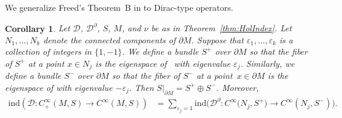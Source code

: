 \documentclass[11pt]{article}
\numberwithin{equation}{section}
\numberwithin{equation}{section}
\newtheorem{Corollary}[Theorem]{Corollary}
\begin{document}
We generalize Freed's Theorem~B in \cite{Freed} to Dirac-type operators.

\begin{Corollary}\label{cor:Freed}
Let $\mathcal{D}$, $\mathcal{D}^\partial$, $S$, $M$, and $\nu$ be as in Theorem~{\rm\ref{thm:HolIndex}}.
Let $N_1,\hdots,N_k$ denote the connected components of $\partial M$.
Suppose that $\varepsilon_1,\hdots,\varepsilon_k$ is a collection of integers in $\{1,-1\}$. We define a bundle $S^+$ over $\partial M$ so that the fiber of $S^+$ at a point $x \in N_j$ is the eigenspace of~ with eigenvalue $\varepsilon_j$. Similarly, we define a bundle $S^-$ over $\partial M$ so that the fiber of $S^-$ at a point~${x \in \partial M}$ is the eigenspace of  with eigenvalue $-\varepsilon_j$. Then $S|_{\partial M} = S^+ \oplus S^-$. Moreover,
\begin{align*}
\mathrm{ind}(\mathcal{D}\colon C^\infty_+(M,S)\to C^\infty(M,S))
&=
\sum_{\varepsilon_j=1} \mathrm{ind}\big(\mathcal{D}^\partial\colon C^\infty\big(N_j,S^+\big)\to C^\infty(N_j,S^-)\big) .
\end{align*}
\end{Corollary}
\end{document}
